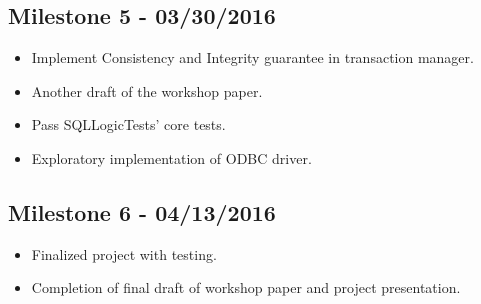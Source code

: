 \documentclass[letterpaper]{article}
\begin{document}
  \subsection{Milestone 5 - 03/30/2016}
   \begin{itemize}
    \item Implement Consistency and Integrity guarantee in transaction manager.
    \item Another draft of the workshop paper.
    \item Pass SQLLogicTests' core tests.
    \item Exploratory implementation of ODBC driver.
   \end{itemize}
   \subsection{Milestone 6 - 04/13/2016}
   \begin{itemize}
    \item Finalized project with testing. 
    \item Completion of final draft of workshop paper and project presentation.
   \end{itemize}
\end{document}

